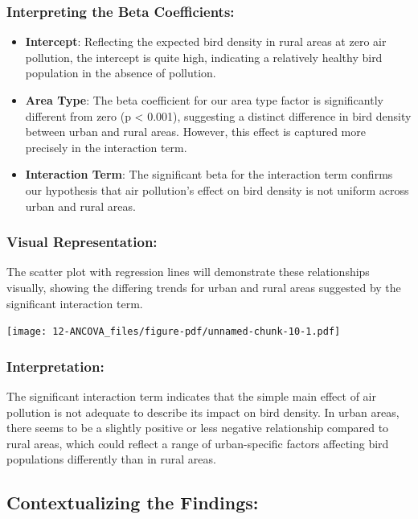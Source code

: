 \documentclass[
  letterpaper,
  DIV=11,
  numbers=noendperiod]{scrreprt}
\begin{document}
\subsubsection{Interpreting the Beta
Coefficients:}\label{interpreting-the-beta-coefficients}

\begin{itemize}
\item
  \textbf{Intercept}: Reflecting the expected bird density in rural
  areas at zero air pollution, the intercept is quite high, indicating a
  relatively healthy bird population in the absence of pollution.
\item
  \textbf{Area Type}: The beta coefficient for our area type factor is
  significantly different from zero (p \textless{} 0.001), suggesting a
  distinct difference in bird density between urban and rural areas.
  However, this effect is captured more precisely in the interaction
  term.
\item
  \textbf{Interaction Term}: The significant beta for the interaction
  term confirms our hypothesis that air pollution's effect on bird
  density is not uniform across urban and rural areas.
\end{itemize}

\subsubsection{Visual Representation:}\label{visual-representation}

The scatter plot with regression lines will demonstrate these
relationships visually, showing the differing trends for urban and rural
areas suggested by the significant interaction term.

\texttt{[image: 12-ANCOVA\_files/figure-pdf/unnamed-chunk-10-1.pdf]}

\subsubsection{Interpretation:}\label{interpretation}

The significant interaction term indicates that the simple main effect
of air pollution is not adequate to describe its impact on bird density.
In urban areas, there seems to be a slightly positive or less negative
relationship compared to rural areas, which could reflect a range of
urban-specific factors affecting bird populations differently than in
rural areas.

\subsection{Contextualizing the
Findings:}\label{contextualizing-the-findings}
\end{document}
